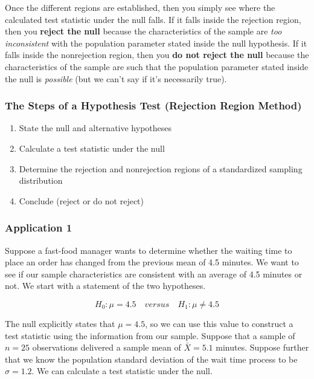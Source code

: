 \documentclass[
]{book}
\begin{document}
Once the different regions are established, then you simply see where the calculated test statistic under the null falls. If it falls inside the rejection region, then you \textbf{reject the null} because the characteristics of the sample are \emph{too inconsistent} with the population parameter stated inside the null hypothesis. If it falls inside the nonrejection region, then you \textbf{do not reject the null} because the characteristics of the sample are such that the population parameter stated inside the null is \emph{possible} (but we can't say if it's necessarily true).

\hypertarget{the-steps-of-a-hypothesis-test-rejection-region-method}{%
\subsubsection*{The Steps of a Hypothesis Test (Rejection Region Method)}\label{the-steps-of-a-hypothesis-test-rejection-region-method}}

\begin{enumerate}
\def\labelenumi{\arabic{enumi}.}
\item
  State the null and alternative hypotheses
\item
  Calculate a test statistic under the null
\item
  Determine the rejection and nonrejection regions of a standardized sampling distribution
\item
  Conclude (reject or do not reject)
\end{enumerate}

\hypertarget{application-1-1}{%
\subsubsection*{Application 1}\label{application-1-1}}

Suppose a fast-food manager wants to determine whether the waiting time to place an order has changed from the previous mean of 4.5 minutes. We want to see if our sample characteristics are consistent with an average of 4.5 minutes or not. We start with a statement of the two hypotheses.

\[H_0:\mu=4.5 \quad versus \quad H_1:\mu\neq 4.5\]

The null explicitly states that \(\mu=4.5\), so we can use this value to construct a test statistic using the information from our sample. Suppose that a sample of \(n=25\) observations delivered a sample mean of \(\bar{X}=5.1\) minutes. Suppose further that we know the population standard deviation of the wait time process to be \(\sigma=1.2\). We can calculate a test statistic under the null.
\end{document}
